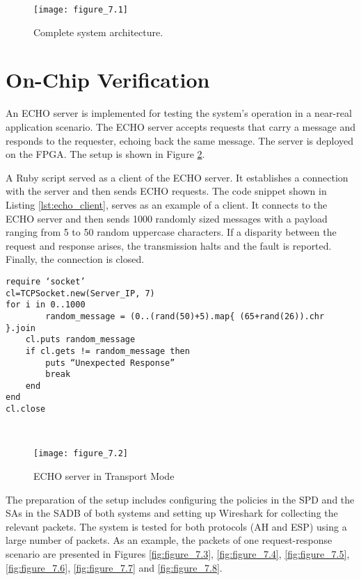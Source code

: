 \begin{figure}
\centering
\texttt{[image: figure\_7.1]}\\
\caption{ Complete system architecture. }
\label{fig:figure_7.1}
\end{figure}

\section{On-Chip Verification}
An ECHO server is implemented for testing the system's operation in a near-real application scenario. The ECHO server accepts requests that carry a message and responds to the requester, echoing back the same message. The server is deployed on the FPGA. The setup is shown in Figure \ref{fig:figure_7.2}. 

A Ruby script served as a client of the ECHO server. It establishes a connection with the server and then sends ECHO requests. The code snippet shown in Listing \ref{lst:echo_client}, serves as an example of a client. It connects to the ECHO server and then sends 1000 randomly sized messages with a payload ranging from 5 to 50 random uppercase characters. If a disparity between the request and response arises, the transmission halts and the fault is reported. Finally, the connection is closed.\\

\noindent
\begin{minipage}{\linewidth}
\begin{lstlisting}[style=mycodestyle, label={lst:echo_client}, caption={ECHO client Ruby implementation}]
require ‘socket’
cl=TCPSocket.new(Server_IP, 7)
for i in 0..1000
 	    random_message = (0..(rand(50)+5).map{ (65+rand(26)).chr }.join
    cl.puts random_message
    if cl.gets != random_message then
        puts “Unexpected Response”
        break
    end
end
cl.close  
\end{lstlisting}
\end{minipage}\\

\begin{figure}
\centering
\texttt{[image: figure\_7.2]}\\
\caption{ ECHO server in Transport Mode }
\label{fig:figure_7.2}
\end{figure}

The preparation of the setup includes configuring the policies in the SPD and the SAs in the SADB \cite{setkey_manpage} of both systems and setting up Wireshark for collecting the relevant packets. The system is tested for both protocols (AH and ESP) using a large number of packets. As an example, the packets of one request-response scenario are presented in Figures \ref{fig:figure_7.3}, \ref{fig:figure_7.4}, \ref{fig:figure_7.5},  \ref{fig:figure_7.6}, \ref{fig:figure_7.7} and \ref{fig:figure_7.8}.

